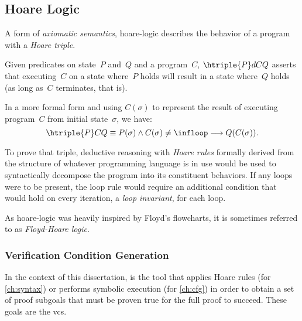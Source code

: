 \subsection{Hoare Logic}\label{se:hoare}
A form of \emph{axiomatic semantics},
\gls{hoare-logic} \autocite{hoare1969axiomatic,myreen2007hoare}
describes the behavior of a program with a \emph{Hoare triple}.
\begin{definition}\label{hoare-triple}
  Given predicates on state~$P$ and~$Q$ and a program~$C$,
  $\htriple{P}dC{Q}$ asserts that executing~$C$ on a state where~$P$ holds
  will result in a state where~$Q$ holds (as long as~$C$ terminates, that is).

  In a more formal form and using $C(\sigma)$ to represent the result
  of executing program~$C$ from initial state~$\sigma$, we have:
  \begin{equation*}
    \htriple{P}C{Q}\equiv P(\sigma)\land C(\sigma)\neq\infloop\longrightarrow
    Q(C(\sigma)).
  \end{equation*}
\end{definition}
To prove that triple, deductive reasoning with \emph{Hoare rules}%
formally derived from the structure of whatever programming language is in use
would be used to syntactically decompose the program into its constituent behaviors.
If any loops were to be present, the loop rule would require an additional condition
that would hold on every iteration, a \emph{loop invariant}, for each loop.

As \gls{hoare-logic} was heavily inspired by Floyd's flowcharts, it is sometimes referred to
as \emph{Floyd-Hoare logic}.

\subsubsection{Verification Condition Generation}
In the context of this dissertation,
 is the tool that applies Hoare rules (for \cref{ch:syntax})
or performs symbolic execution (for \cref{ch:cfg})
in order to obtain a set of proof subgoals
that must be proven true for the full proof to succeed.
These goals are the \acp{vc}.


